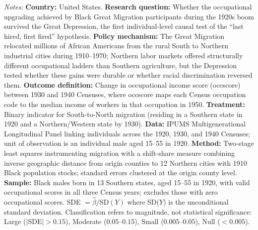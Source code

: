 \begin{table}[H]
\begin{threeparttable}
\begin{tablenotes}[flushleft]
\item \textit{Notes:} \textbf{Country:} United States. \textbf{Research question:} Whether the occupational upgrading achieved by Black Great Migration participants during the 1920s boom survived the Great Depression, the first individual-level causal test of the ``last hired, first fired'' hypothesis. \textbf{Policy mechanism:} The Great Migration relocated millions of African Americans from the rural South to Northern industrial cities during 1910--1970; Northern labor markets offered structurally different occupational ladders than Southern agriculture, but the Depression tested whether these gains were durable or whether racial discrimination reversed them. \textbf{Outcome definition:} Change in occupational income score (occscore) between 1930 and 1940 Censuses, where occscore maps each Census occupation code to the median income of workers in that occupation in 1950. \textbf{Treatment:} Binary indicator for South-to-North migration (residing in a Southern state in 1920 and a Northern/Western state by 1930). \textbf{Data:} IPUMS Multigenerational Longitudinal Panel linking individuals across the 1920, 1930, and 1940 Censuses; unit of observation is an individual male aged 15--55 in 1920. \textbf{Method:} Two-stage least squares instrumenting migration with a shift-share measure combining inverse geographic distance from origin counties to 12 Northern cities with 1910 Black population stocks; standard errors clustered at the origin county level. \textbf{Sample:} Black males born in 13 Southern states, aged 15--55 in 1920, with valid occupational scores in all three Census years; excludes those with zero occupational scores. SDE $= \hat{\beta} / \text{SD}(Y)$ where SD($Y$) is the unconditional standard deviation. Classification refers to magnitude, not statistical significance: Large ($|$SDE$| > 0.15$), Moderate ($0.05$--$0.15$), Small ($0.005$--$0.05$), Null ($< 0.005$).
\end{tablenotes}
\end{threeparttable}
\end{table}

